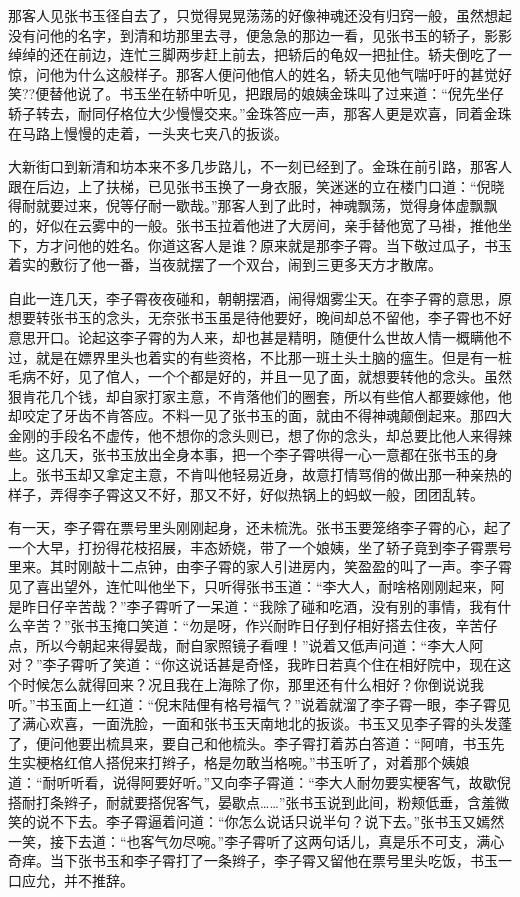 \documentclass[12pt,UTF8]{ctexbook}
\begin{document}
{{{那客人见张书玉径自去了，只觉得晃晃荡荡的好像神魂还没有归窍一般，虽然想起没有问他的名字，到清和坊那里去寻，便急急的那边一看，见张书玉的轿子，影影绰绰的还在前边，连忙三脚两步赶上前去，把轿后的龟奴一把扯住。轿夫倒吃了一惊，问他为什么这般样子。那客人便问他倌人的姓名，轿夫见他气喘吁吁的甚觉好笑??便替他说了。书玉坐在轿中听见，把跟局的娘姨金珠叫了过来道：“倪先坐仔轿子转去，耐同仔格位大少慢慢交来。”金珠答应一声，那客人更是欢喜，同着金珠在马路上慢慢的走着，一头夹七夹八的扳谈。

大新街口到新清和坊本来不多几步路儿，不一刻已经到了。金珠在前引路，那客人跟在后边，上了扶梯，已见张书玉换了一身衣服，笑迷迷的立在楼门口道：“倪晓得耐就要过来，倪等仔耐一歇哉。”那客人到了此时，神魂飘荡，觉得身体虚飘飘的，好似在云雾中的一般。张书玉拉着他进了大房间，亲手替他宽了马褂，推他坐下，方才问他的姓名。你道这客人是谁？原来就是那李子霄。当下敬过瓜子，书玉着实的敷衍了他一番，当夜就摆了一个双台，闹到三更多天方才散席。

自此一连几天，李子霄夜夜碰和，朝朝摆酒，闹得烟雾尘天。在李子霄的意思，原想要转张书玉的念头，无奈张书玉虽是待他要好，晚间却总不留他，李子霄也不好意思开口。论起这李子霄的为人来，却也甚是精明，随便什么世故人情一概瞒他不过，就是在嫖界里头也着实的有些资格，不比那一班土头土脑的瘟生。但是有一桩毛病不好，见了倌人，一个个都是好的，并且一见了面，就想要转他的念头。虽然狠肯花几个钱，却自家打家主意，不肯落他们的圈套，所以有些倌人都要嫁他，他却咬定了牙齿不肯答应。不料一见了张书玉的面，就由不得神魂颠倒起来。那四大金刚的手段名不虚传，他不想你的念头则已，想了你的念头，却总要比他人来得辣些。这几天，张书玉放出全身本事，把一个李子霄哄得一心一意都在张书玉的身上。张书玉却又拿定主意，不肯叫他轻易近身，故意打情骂俏的做出那一种亲热的样子，弄得李子霄这又不好，那又不好，好似热锅上的蚂蚁一般，团团乱转。

有一天，李子霄在票号里头刚刚起身，还未梳洗。张书玉要笼络李子霄的心，起了一个大早，打扮得花枝招展，丰态娇娆，带了一个娘姨，坐了轿子竟到李子霄票号里来。其时刚敲十二点钟，由李子霄的家人引进房内，笑盈盈的叫了一声。李子霄见了喜出望外，连忙叫他坐下，只听得张书玉道：“李大人，耐啥格刚刚起来，阿是昨日仔辛苦哉？”李子霄听了一呆道：“我除了碰和吃酒，没有别的事情，我有什么辛苦？”张书玉掩口笑道：“勿是呀，作兴耐昨日仔到仔相好搭去住夜，辛苦仔点，所以今朝起来得晏哉，耐自家照镜子看哩！”说着又低声问道：“李大人阿对？”李子霄听了笑道：“你这说话甚是奇怪，我昨日若真个住在相好院中，现在这个时候怎么就得回来？况且我在上海除了你，那里还有什么相好？你倒说说我听。”书玉面上一红道：“倪末陆俚有格号福气？”说着就溜了李子霄一眼，李子霄见了满心欢喜，一面洗脸，一面和张书玉天南地北的扳谈。书玉又见李子霄的头发蓬了，便问他要出梳具来，要自己和他梳头。李子霄打着苏白答道：“阿唷，书玉先生实梗格红倌人搭倪来打辫子，格是勿敢当格啘。”书玉听了，对着那个姨娘道：“耐听听看，说得阿要好听。”又向李子霄道：“李大人耐勿要实梗客气，故歇倪搭耐打条辫子，耐就要搭倪客气，晏歇点……”张书玉说到此间，粉颊低垂，含羞微笑的说不下去。李子霄逼着问道：“你怎么说话只说半句？说下去。”张书玉又嫣然一笑，接下去道：“也客气勿尽啘。”李子霄听了这两句话儿，真是乐不可支，满心奇痒。当下张书玉和李子霄打了一条辫子，李子霄又留他在票号里头吃饭，书玉一口应允，并不推辞。

}}}
\end{document}
